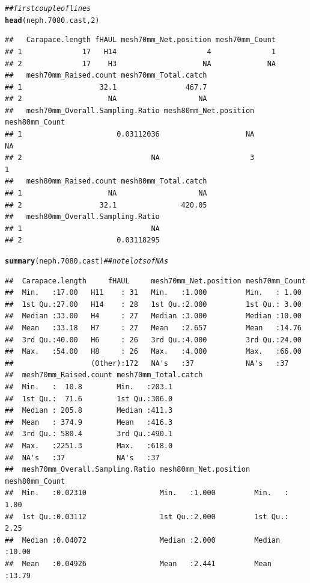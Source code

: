 \documentclass[12pt]{article}\usepackage[]{graphicx}\usepackage[]{color}
\makeatletter
\newcommand{\hlnum}[1]{\textcolor[rgb]{0.686,0.059,0.569}{#1}}%
\newcommand{\hlcom}[1]{\textcolor[rgb]{0.678,0.584,0.686}{\textit{#1}}}%
\newcommand{\hlstd}[1]{\textcolor[rgb]{0.345,0.345,0.345}{#1}}%
\newcommand{\hlkwd}[1]{\textcolor[rgb]{0.737,0.353,0.396}{\textbf{#1}}}%
\newenvironment{kframe}{%
 \def\at@end@of@kframe{}%
 \ifinner\ifhmode%
  \def\at@end@of@kframe{\end{minipage}}%
  \begin{minipage}{\columnwidth}%
 \fi\fi%
 \def\FrameCommand##1{\hskip\@totalleftmargin \hskip-\fboxsep
 \colorbox{shadecolor}{##1}\hskip-\fboxsep
     \hskip-\linewidth \hskip-\@totalleftmargin \hskip\columnwidth}%
 \MakeFramed {\advance\hsize-\width
   \@totalleftmargin\z@ \linewidth\hsize
   \@setminipage}}%
 {\par\unskip\endMakeFramed%
 \at@end@of@kframe}
\newenvironment{knitrout}{}{} %
\makeatother
\begin{document}
\begin{knitrout}
\begin{kframe}
\begin{alltt}
\hlcom{## first couple of lines}
\hlkwd{head}\hlstd{(neph.7080.cast,} \hlnum{2}\hlstd{)}
\end{alltt}
\begin{verbatim}
##   Carapace.length fHAUL mesh70mm_Net.position mesh70mm_Count
## 1              17   H14                     4              1
## 2              17    H3                    NA             NA
##   mesh70mm_Raised.count mesh70mm_Total.catch
## 1                  32.1                467.7
## 2                    NA                   NA
##   mesh70mm_Overall.Sampling.Ratio mesh80mm_Net.position mesh80mm_Count
## 1                      0.03112036                    NA             NA
## 2                              NA                     3              1
##   mesh80mm_Raised.count mesh80mm_Total.catch
## 1                    NA                   NA
## 2                  32.1               420.05
##   mesh80mm_Overall.Sampling.Ratio
## 1                              NA
## 2                      0.03118295
\end{verbatim}
\begin{alltt}
\hlkwd{summary}\hlstd{(neph.7080.cast)} \hlcom{## note lots of NAs}
\end{alltt}
\begin{verbatim}
##  Carapace.length     fHAUL     mesh70mm_Net.position mesh70mm_Count 
##  Min.   :17.00   H11    : 31   Min.   :1.000         Min.   : 1.00  
##  1st Qu.:27.00   H14    : 28   1st Qu.:2.000         1st Qu.: 3.00  
##  Median :33.00   H4     : 27   Median :3.000         Median :10.00  
##  Mean   :33.18   H7     : 27   Mean   :2.657         Mean   :14.76  
##  3rd Qu.:40.00   H6     : 26   3rd Qu.:4.000         3rd Qu.:24.00  
##  Max.   :54.00   H8     : 26   Max.   :4.000         Max.   :66.00  
##                  (Other):172   NA's   :37            NA's   :37     
##  mesh70mm_Raised.count mesh70mm_Total.catch
##  Min.   :  10.8        Min.   :203.1       
##  1st Qu.:  71.6        1st Qu.:306.0       
##  Median : 205.8        Median :411.3       
##  Mean   : 374.9        Mean   :416.3       
##  3rd Qu.: 580.4        3rd Qu.:490.1       
##  Max.   :2251.3        Max.   :618.0       
##  NA's   :37            NA's   :37          
##  mesh70mm_Overall.Sampling.Ratio mesh80mm_Net.position mesh80mm_Count 
##  Min.   :0.02310                 Min.   :1.000         Min.   : 1.00  
##  1st Qu.:0.03112                 1st Qu.:2.000         1st Qu.: 2.25  
##  Median :0.04072                 Median :2.000         Median :10.00  
##  Mean   :0.04926                 Mean   :2.441         Mean   :13.79  

\end{verbatim}
\end{kframe}
\end{knitrout}
\end{document}

